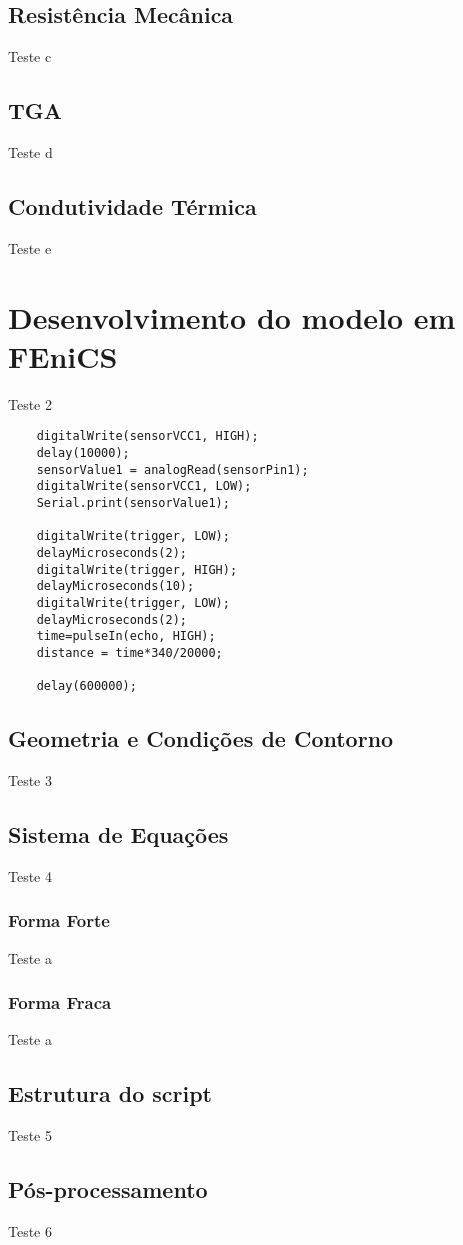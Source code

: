     \subsection{Resistência Mecânica}\label{mat:rm}
    Teste c

    \subsection{TGA}\label{mat:TGA}
    Teste d

    \subsection{Condutividade Térmica}\label{mat:condutividade}
    Teste e


\section{Desenvolvimento do modelo em FEniCS}\label{mat:fenics}
Teste 2

    \begin{lstlisting}
    digitalWrite(sensorVCC1, HIGH);
    delay(10000);
    sensorValue1 = analogRead(sensorPin1);
    digitalWrite(sensorVCC1, LOW);
    Serial.print(sensorValue1);

    digitalWrite(trigger, LOW);
    delayMicroseconds(2);
    digitalWrite(trigger, HIGH);
    delayMicroseconds(10);
    digitalWrite(trigger, LOW);
    delayMicroseconds(2);
    time=pulseIn(echo, HIGH);
    distance = time*340/20000;

    delay(600000);
    \end{lstlisting}

    
    \subsection{Geometria e Condições de Contorno}\label{mat:geo_bcs}
    Teste 3

    \subsection{Sistema de Equações}\label{mat:eqs}
    Teste 4

    \subsubsection{Forma Forte}\label{mat:forte}
    Teste a

    \subsubsection{Forma Fraca}\label{mat:fraca}
    Teste a

    \subsection{Estrutura do script}\label{mat:script}
    Teste 5

    \subsection{Pós-processamento}
    Teste 6